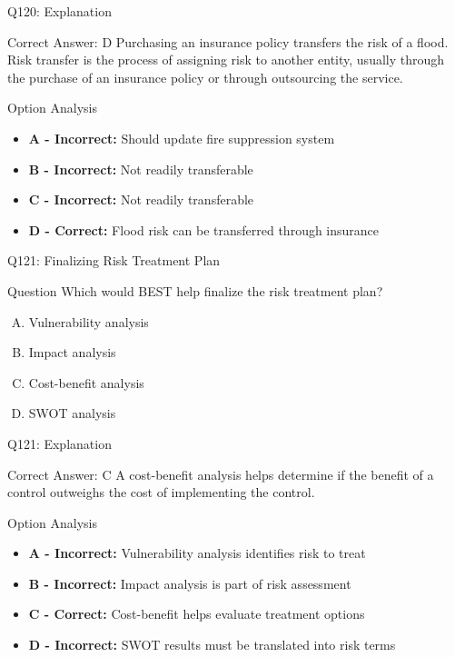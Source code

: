 \documentclass{beamer}
\begin{document}
	\begin{frame}{Q120: Explanation}
		\begin{block}{Correct Answer: D}
			Purchasing an insurance policy transfers the risk of a flood. Risk transfer is the process of assigning risk to another entity, usually through the purchase of an insurance policy or through outsourcing the service.
		\end{block}
		\begin{block}{Option Analysis}
			\begin{itemize}
				\item \textbf{A - Incorrect:} Should update fire suppression system
				\item \textbf{B - Incorrect:} Not readily transferable
				\item \textbf{C - Incorrect:} Not readily transferable
				\item \textbf{D - Correct:} Flood risk can be transferred through insurance
			\end{itemize}
		\end{block}
	\end{frame}
	
	\begin{frame}{Q121: Finalizing Risk Treatment Plan}
		\begin{block}{Question}
			Which would BEST help finalize the risk treatment plan?
		\end{block}
		\begin{enumerate}[(A)]
			\item Vulnerability analysis
			\item Impact analysis
			\item Cost-benefit analysis
			\item SWOT analysis
		\end{enumerate}
	\end{frame}
	
	\begin{frame}{Q121: Explanation}
		\begin{block}{Correct Answer: C}
			A cost-benefit analysis helps determine if the benefit of a control outweighs the cost of implementing the control.
		\end{block}
		\begin{block}{Option Analysis}
			\begin{itemize}
				\item \textbf{A - Incorrect:} Vulnerability analysis identifies risk to treat
				\item \textbf{B - Incorrect:} Impact analysis is part of risk assessment
				\item \textbf{C - Correct:} Cost-benefit helps evaluate treatment options
				\item \textbf{D - Incorrect:} SWOT results must be translated into risk terms
			\end{itemize}
		\end{block}
	\end{frame}
	
\end{document}
